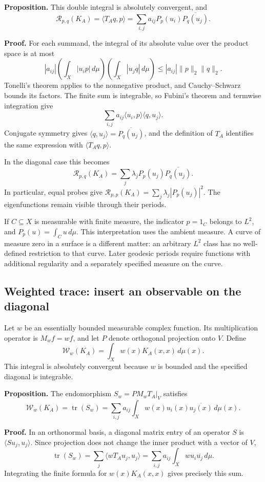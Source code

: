 \textbf{Proposition.} This double integral is absolutely convergent, and
\[
\mathcal R_{p,q}(K_A)
=\langle T_Aq,p\rangle
=\sum_{i,j}a_{ij}P_p(u_i)\overline{P_q(u_j)}.
\]

\textbf{Proof.} For each summand, the integral of its absolute value over the product space is at most
\[
|a_{ij}|
\left(\int_X|u_i p|\,d\mu\right)
\left(\int_X|u_j q|\,d\mu\right)
\leq |a_{ij}|\|p\|_2\|q\|_2.
\]
Tonelli's theorem applies to the nonnegative product, and Cauchy--Schwarz bounds its factors. The finite sum is integrable, so Fubini's theorem and termwise integration give
\[
\sum_{i,j}a_{ij}\langle u_i,p\rangle\langle q,u_j\rangle.
\]
Conjugate symmetry gives \(\langle q,u_j\rangle=\overline{P_q(u_j)}\), and the definition of \(T_A\) identifies the same expression with \(\langle T_Aq,p\rangle\).

In the diagonal case this becomes
\[
\mathcal R_{p,q}(K_A)
=\sum_j\lambda_j P_p(u_j)\overline{P_q(u_j)}.
\]
In particular, equal probes give \(\mathcal R_{p,p}(K_A)=\sum_j\lambda_j|P_p(u_j)|^2\). The eigenfunctions remain visible through their periods.

If \(C\subseteq X\) is measurable with finite measure, the indicator \(p=1_C\) belongs to \(L^2\), and \(P_p(u)=\int_Cu\,d\mu\). This interpretation uses the ambient measure. A curve of measure zero in a surface is a different matter: an arbitrary \(L^2\) class has no well-defined restriction to that curve. Later geodesic periods require functions with additional regularity and a separately specified measure on the curve.

\subsection{Weighted trace: insert an observable on the diagonal}\label{weighted-finite-trace}

Let \(w\) be an essentially bounded measurable complex function. Its multiplication operator is \(M_wf=wf\), and let \(P\) denote orthogonal projection onto \(V\). Define
\[
\mathcal W_w(K_A)=\int_Xw(x)K_A(x,x)\,d\mu(x).
\]
This integral is absolutely convergent because \(w\) is bounded and the specified diagonal is integrable.

\textbf{Proposition.} The endomorphism \(S_w=P M_w T_A|_V\) satisfies
\[
\mathcal W_w(K_A)=\operatorname{tr}(S_w)
=\sum_{i,j}a_{ij}\int_Xw(x)u_i(x)\overline{u_j(x)}\,d\mu(x).
\]

\textbf{Proof.} In an orthonormal basis, a diagonal matrix entry of an operator \(S\) is \(\langle Su_j,u_j\rangle\). Since projection does not change the inner product with a vector of \(V\),
\[
\operatorname{tr}(S_w)
=\sum_j\langle wT_Au_j,u_j\rangle
=\sum_{i,j}a_{ij}\int_Xwu_i\overline{u_j}\,d\mu.
\]
Integrating the finite formula for \(w(x)K_A(x,x)\) gives precisely this sum.

